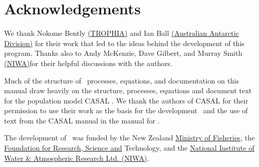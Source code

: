 \section{Acknowledgements\label{sec:acknowledgements}}

We thank Nokome Bently \href{http://www.trophia.co.nz/}{(TROPHIA)} and Ian Ball \href{http://www.aad.gov.au/}{(Australian Antarctic Division)} for their work that led to the ideas behind the development of this program. Thanks also to Andy McKenzie, Dave Gilbert, and Murray Smith \href{http://www.niwa.co.nz}{(NIWA)}for their helpful discussions with the authors. 

Much of the structure of \SPM\ processes, equations, and documentation on this manual draw heavily on the structure, processes, equations and document text for the population model CASAL \citep{1388}. We thank the authors of CASAL for their permission to use their work as the basis for the development \SPM\ and the use of text from the CASAL manual in the manual for \SPM.

The development of \SPM\ was funded by the New Zealand \href{http://www.fish.govt.nz}{Ministry of Fisheries}, the \href{http://www.frst.govt.nz/}{Foundation for Research, Science and} Technology, and the \href{http://www.niwa.co.nz}{National Institute of Water \& Atmospheric Research Ltd. (NIWA)}. 
